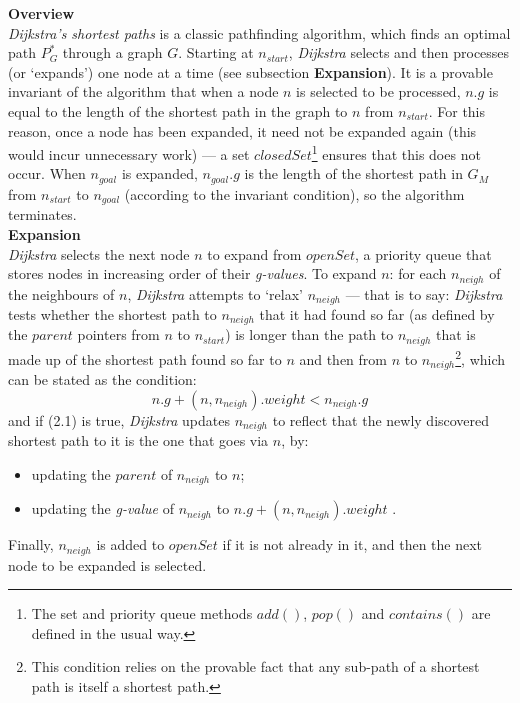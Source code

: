 \documentclass[12pt,notitlepage]{report}
\begin{document}
\noindent
{\bf Overview}\\
\noindent
{\em Dijkstra's shortest paths} is a classic pathfinding algorithm, which finds an optimal path\cite{Dij59} $P^{*}_{G}$ through a graph $G$. Starting at $n_{start}$, {\em Dijkstra} selects and then processes (or `expands') one node at a time (see subsection {\bfseries Expansion}). It is a provable\cite{CormenDijkstra} invariant of the algorithm that when a node $n$ is selected to be processed, $n.g$ is equal to the length of the shortest path in the graph to $n$ from $n_{start}$. For this reason, once a node has been expanded, it need not be expanded again (this would incur unnecessary work) --- a set $closedSet$\footnote{The set and priority queue methods $add()$, $pop()$ and  $contains()$ are defined in the usual way.} ensures that this does not occur. When $n_{goal}$ is expanded, $n_{goal}.g$ is the length of the shortest path in $G_{M}$ from $n_{start}$ to $n_{goal}$ (according to the invariant condition), so the algorithm terminates.\\

\noindent
{\bf Expansion}\\
\noindent
{\em Dijkstra} selects the next node $n$ to expand from $openSet$, a priority queue that stores nodes in increasing order of their {\em g-values}. To expand $n$: for each $n_{neigh}$ of the neighbours of $n$, {\em Dijkstra} attempts to `relax' $n_{neigh}$ --- that is to say: {\em Dijkstra} tests whether the shortest path to $n_{neigh}$ that it had found so far (as defined by the $parent$ pointers from $n$ to $n_{start}$) is longer than the path to $n_{neigh}$ that is made up of the shortest path found so far to $n$ and then from $n$ to $n_{neigh}$\footnote{This condition relies on the provable\cite{CormenDijkstra} fact that any sub-path of a shortest path is itself a shortest path.}, which can be stated as the condition:
\begin{equation}
n.g + (n,n_{neigh}).weight < n_{neigh}.g
\end{equation}
\noindent
and if (2.1) is true, {\em Dijkstra} updates $n_{neigh}$ to reflect that the newly discovered shortest path to it is the one that goes via $n$, by: 
\begin{itemize}
\item updating the $parent$ of $n_{neigh}$ to $n$;
\item updating the {\em g-value} of $n_{neigh}$ to $n.g + (n,n_{neigh}).weight$ .
\end{itemize}
Finally, $n_{neigh}$ is added to $openSet$ if it is not already in it, and then the next node to be expanded is selected.\\
\end{document}
